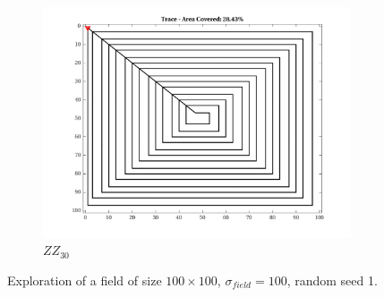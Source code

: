 \begin{figure}[htb!]
\begin{subfigure}[t]{0.25\textwidth}
    \end{subfigure}%
    \begin{subfigure}[t]{0.25\textwidth}
        \centering
        \includegraphics[width=\linewidth]{figures/path_zz_30p_100x100_sf_100_seed_1.png}
        \captionsetup{skip=0.20\baselineskip,size=footnotesize}
        \caption{$ZZ_{30}$}
    \end{subfigure}%
    \captionsetup{skip=0.20\baselineskip}
    \caption{Exploration of a field of size $100 \times 100$, $\sigma_{field} = 100$, random seed 1.}
    \label{fig:sf100}
\end{figure}


